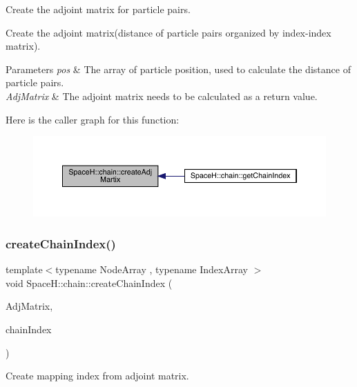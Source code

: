 Create the adjoint matrix for particle pairs. 

Create the adjoint matrix(distance of particle pairs organized by index-\/index matrix). 
\begin{DoxyParams}{Parameters}
{\em pos} & The array of particle position, used to calculate the distance of particle pairs. \\
\hline
{\em Adj\+Matrix} & The adjoint matrix needs to be calculated as a return value. \\
\hline
\end{DoxyParams}
Here is the caller graph for this function\+:\nopagebreak
\begin{figure}[H]
\begin{center}
\leavevmode
\includegraphics[width=350pt]{namespace_space_h_1_1chain_a8d2f8c8026f24294d16309c4f2e11fdb_icgraph}
\end{center}
\end{figure}
\mbox{\label{namespace_space_h_1_1chain_a65d906373401066033d8e4a6ad581cce}} 
\subsubsection{\texorpdfstring{create\+Chain\+Index()}{createChainIndex()}}
{\footnotesize\ttfamily template$<$typename Node\+Array , typename Index\+Array $>$ \\
void Space\+H\+::chain\+::create\+Chain\+Index (\begin{DoxyParamCaption}\item[{Node\+Array \&}]{Adj\+Matrix,  }\item[{Index\+Array \&}]{chain\+Index }\end{DoxyParamCaption})}



Create mapping index from adjoint matrix. 

